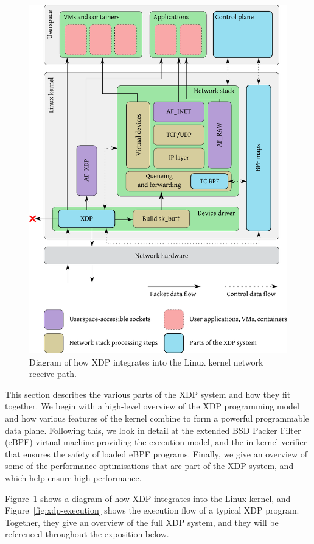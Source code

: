 \documentclass[10pt,sigconf]{acmart}
\begin{document}
\begin{figure}[t]
\centering
\includegraphics[width=\linewidth]{figures/kernel-diagram.pdf}
\caption{\label{fig:xdp-kernel} Diagram of how XDP integrates into the Linux
  kernel network receive path.}
\end{figure}


This section describes the various parts of the XDP system and how they fit
together. We begin with a high-level overview of the XDP programming model and
how various features of the kernel combine to form a powerful programmable data
plane. Following this, we look in detail at the extended BSD Packer Filter
(eBPF) virtual machine providing the execution model, and the in-kernel verifier
that ensures the safety of loaded eBPF programs. Finally, we give an overview of
some of the performance optimisations that are part of the XDP system, and which
help ensure high performance.

Figure~\ref{fig:xdp-kernel} shows a diagram of how XDP integrates into the Linux
kernel, and Figure~\ref{fig:xdp-execution} shows the execution flow of a typical
XDP program. Together, they give an overview of the full XDP system, and they
will be referenced throughout the exposition below.
\end{document}

